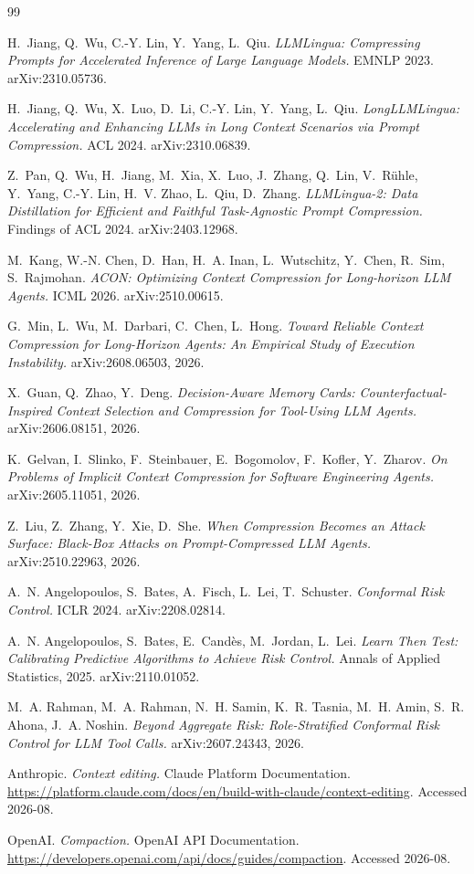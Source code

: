 \documentclass[11pt]{article}
\begin{document}
\begin{thebibliography}{99}

 H.~Jiang, Q.~Wu, C.-Y. Lin, Y.~Yang, L.~Qiu.
\emph{LLMLingua: Compressing Prompts for Accelerated Inference of Large Language
Models.} EMNLP 2023. arXiv:2310.05736.

 H.~Jiang, Q.~Wu, X.~Luo, D.~Li, C.-Y. Lin, Y.~Yang, L.~Qiu.
\emph{LongLLMLingua: Accelerating and Enhancing LLMs in Long Context Scenarios via
Prompt Compression.} ACL 2024. arXiv:2310.06839.

 Z.~Pan, Q.~Wu, H.~Jiang, M.~Xia, X.~Luo, J.~Zhang, Q.~Lin,
V.~R\"uhle, Y.~Yang, C.-Y. Lin, H.~V. Zhao, L.~Qiu, D.~Zhang.
\emph{LLMLingua-2: Data Distillation for Efficient and Faithful Task-Agnostic
Prompt Compression.} Findings of ACL 2024. arXiv:2403.12968.

 M.~Kang, W.-N. Chen, D.~Han, H.~A. Inan, L.~Wutschitz, Y.~Chen,
R.~Sim, S.~Rajmohan.
\emph{ACON: Optimizing Context Compression for Long-horizon LLM Agents.}
ICML 2026. arXiv:2510.00615.

 G.~Min, L.~Wu, M.~Darbari, C.~Chen, L.~Hong.
\emph{Toward Reliable Context Compression for Long-Horizon Agents: An Empirical
Study of Execution Instability.} arXiv:2608.06503, 2026.

 X.~Guan, Q.~Zhao, Y.~Deng.
\emph{Decision-Aware Memory Cards: Counterfactual-Inspired Context Selection and
Compression for Tool-Using LLM Agents.} arXiv:2606.08151, 2026.

 K.~Gelvan, I.~Slinko, F.~Steinbauer, E.~Bogomolov,
F.~Kofler, Y.~Zharov.
\emph{On Problems of Implicit Context Compression for Software Engineering
Agents.} arXiv:2605.11051, 2026.

 Z.~Liu, Z.~Zhang, Y.~Xie, D.~She.
\emph{When Compression Becomes an Attack Surface: Black-Box Attacks on
Prompt-Compressed LLM Agents.} arXiv:2510.22963, 2026.

 A.~N. Angelopoulos, S.~Bates, A.~Fisch, L.~Lei, T.~Schuster.
\emph{Conformal Risk Control.} ICLR 2024. arXiv:2208.02814.

 A.~N. Angelopoulos, S.~Bates, E.~Cand\`es, M.~Jordan, L.~Lei.
\emph{Learn Then Test: Calibrating Predictive Algorithms to Achieve Risk Control.}
Annals of Applied Statistics, 2025. arXiv:2110.01052.

 M.~A. Rahman, M.~A. Rahman, N.~H. Samin, K.~R. Tasnia,
M.~H. Amin, S.~R. Ahona, J.~A. Noshin.
\emph{Beyond Aggregate Risk: Role-Stratified Conformal Risk Control for LLM Tool
Calls.} arXiv:2607.24343, 2026.

 Anthropic.
\emph{Context editing.} Claude Platform Documentation.
\url{https://platform.claude.com/docs/en/build-with-claude/context-editing}.
Accessed 2026-08.

 OpenAI.
\emph{Compaction.} OpenAI API Documentation.
\url{https://developers.openai.com/api/docs/guides/compaction}.
Accessed 2026-08.

\end{thebibliography}
\end{document}
